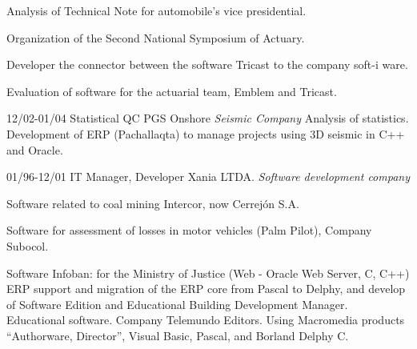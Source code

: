 \begin{entrylist}
{Analysis of Technical Note for automobile’s vice presidential.

Organization of the Second National Symposium of Actuary.

Developer the connector between the software Tricast to the company soft-i
ware.

	Evaluation of software for the actuarial team, Emblem and Tricast.}

  \entry
	{12/02-01/04}
	{Statistical QC}
	{PGS Onshore {\sl Seismic Company}}
	{Analysis of statistics. Development of ERP (Pachallaqta) to manage projects
	using 3D seismic in C++ and Oracle.}

  \entry
	{01/96-12/01}
	{IT Manager, Developer}
	{Xania LTDA. {\sl Software development company}}
	{Software related to coal mining Intercor, now Cerrejón S.A.

Software for assessment of losses in motor vehicles (Palm Pilot), Company
Subocol.

Software Infoban: for the Ministry of Justice (Web - Oracle Web Server, C, C++)
ERP support and migration of the ERP core from Pascal to Delphy, and develop
of Software Edition and Educational Building Development Manager.
Educational software. Company Telemundo Editors. Using Macromedia
products “Authorware, Director”, Visual Basic, Pascal, and Borland Delphy C.


}

  \end{entrylist}
